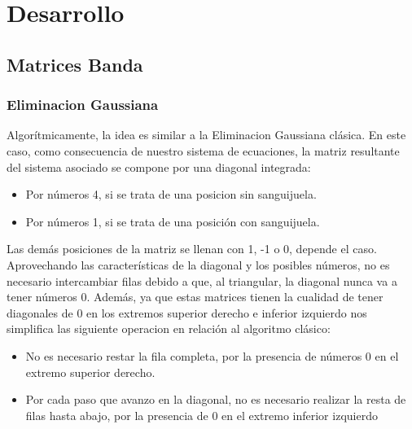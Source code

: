 \section{Desarrollo}

\subsection{Matrices Banda}
\subsubsection{Eliminacion Gaussiana}
Algorítmicamente, la idea es similar a la Eliminacion Gaussiana clásica. En este caso, como consecuencia de nuestro sistema de ecuaciones, la matriz resultante del sistema asociado se compone por una diagonal integrada:
\begin{itemize}
\item Por números 4, si se trata de una posicion sin sanguijuela.
\item Por números 1, si se trata de una posición con sanguijuela.
\end{itemize}

Las demás posiciones de la matriz se llenan con 1, -1 o 0, depende el caso.\\ 
Aprovechando las características de la diagonal y los posibles números, no es necesario intercambiar filas debido a que, al triangular, la diagonal nunca va a tener números 0. Además, ya que estas matrices tienen la cualidad de tener diagonales de 0 en los extremos superior derecho e inferior izquierdo nos simplifica las siguiente operacion en relación al algoritmo clásico:

\begin{itemize}
\item No es necesario restar la fila completa, por la presencia de números 0 en el extremo superior derecho.
\item Por cada paso que avanzo en la diagonal, no es necesario realizar la resta de filas hasta abajo, por la presencia de 0 en el extremo inferior izquierdo  
\end{itemize}

